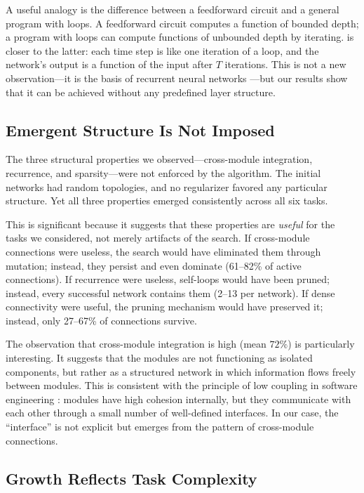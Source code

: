 A useful analogy is the difference between a feedforward circuit and
a general program with loops. A feedforward circuit computes a
function of bounded depth; a program with loops can compute functions
of unbounded depth by iterating. \modnet{} is closer to the latter:
each time step is like one iteration of a loop, and the network's
output is a function of the input after $T$ iterations. This is not a
new observation---it is the basis of recurrent neural networks
\citep{siegelmann1995computational}---but our results show that it
can be achieved without any predefined layer structure.

\subsection{Emergent Structure Is Not Imposed}
\label{sec:interpretation-emergent}

The three structural properties we observed---cross-module
integration, recurrence, and sparsity---were not enforced by the
algorithm. The initial networks had random topologies, and no
regularizer favored any particular structure. Yet all three
properties emerged consistently across all six tasks.

This is significant because it suggests that these properties are
\emph{useful} for the tasks we considered, not merely artifacts of
the search. If cross-module connections were useless, the search
would have eliminated them through mutation; instead, they persist and
even dominate (61--82\% of active connections). If recurrence were
useless, self-loops would have been pruned; instead, every successful
network contains them (2--13 per network). If dense connectivity were
useful, the pruning mechanism would have preserved it; instead, only
27--67\% of connections survive.

The observation that cross-module integration is high (mean $72\%$)
is particularly interesting. It suggests that the modules are not
functioning as isolated components, but rather as a structured
network in which information flows freely between modules. This is
consistent with the principle of low coupling in software engineering
\citep{parnas1972modularity}: modules have high cohesion internally,
but they communicate with each other through a small number of
well-defined interfaces. In our case, the ``interface'' is not
explicit but emerges from the pattern of cross-module connections.

\subsection{Growth Reflects Task Complexity}
\label{sec:interpretation-growth}

